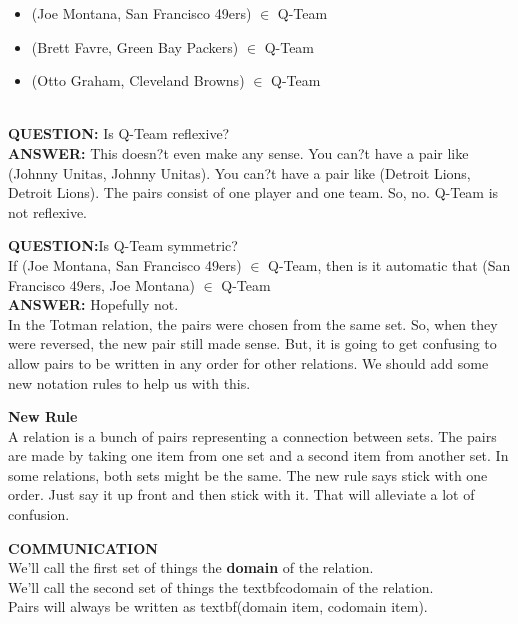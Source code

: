 \documentclass{ximera}
\begin{document}
\begin{example}
\begin{itemize}
 \item (Joe Montana, San Francisco 49ers) $\in$ Q-Team
 \item (Brett Favre, Green Bay Packers) $\in$ Q-Team
 \item (Otto Graham, Cleveland Browns) $\in$ Q-Team
\end{itemize}
\end{example}

\quad \\



\textbf{QUESTION:} Is Q-Team reflexive? \\
\textbf{ANSWER:} This doesn?t even make any sense.  You can?t have a pair like (Johnny Unitas, Johnny Unitas). You can?t have a pair like (Detroit Lions, Detroit Lions).  The pairs consist of one player and one team. So, no. Q-Team is not reflexive.


\textbf{QUESTION:}Is Q-Team symmetric?\\
If (Joe Montana, San Francisco 49ers) $\in$ Q-Team, then is it automatic that (San Francisco 49ers, Joe Montana) $\in$ Q-Team\\
\textbf{ANSWER:} Hopefully not. \\
In the Totman relation, the pairs were chosen from the same set.  So, when they were reversed, the new pair still made sense.  But, it is going to get confusing to allow pairs to be written in any order for other relations. We should add some new notation rules to help us with this.


\textbf{New Rule} \\
A relation is a bunch of pairs representing a connection between sets.  The pairs are made by taking one item from one set and a second item from another set. In some relations, both sets might be the same.  The new rule says stick with one order.  Just say it up front and then stick with it.  That will alleviate a lot of confusion.



\begin{remark} \textbf{COMMUNICATION} \\
We'll call the first set of things the \textbf{domain} of the relation. \\
We'll call the second set of things the textbf{codomain} of the relation.  \\
Pairs will always be written as textbf{(domain item, codomain item)}.
\end{remark}
\end{document}

